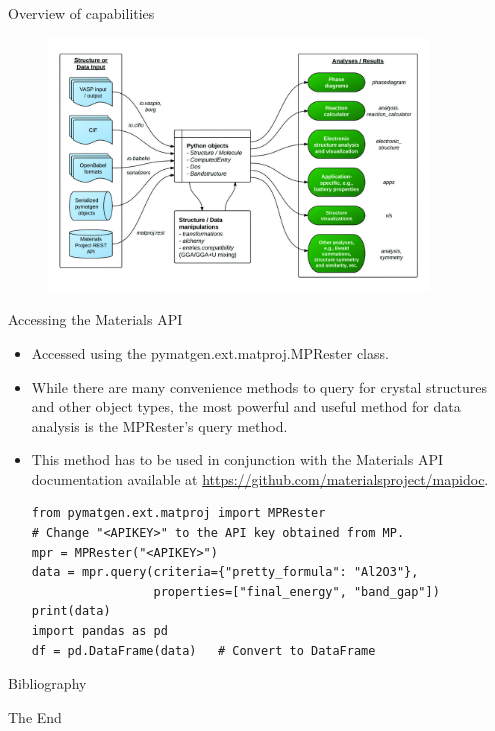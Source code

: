 \documentclass[aspectratio=169]{beamer}
\begin{document}
\begin{frame}{Overview of capabilities}
    \begin{figure}
        \centering
        \includegraphics[width=0.9\textwidth]{figures/pymatgen-overview.jpg}
    \end{figure}
\end{frame}


\begin{frame}[fragile]{Accessing the Materials API}
    \begin{itemize}
        \item Accessed using the pymatgen.ext.matproj.MPRester class.
        \item While there are many convenience methods to query for crystal structures and other object types, the most powerful and useful method for data analysis is the MPRester's query method.
        \item This method has to be used in conjunction with the Materials API documentation available at \url{https://github.com/materialsproject/mapidoc}.
\begin{lstlisting}
from pymatgen.ext.matproj import MPRester
# Change "<APIKEY>" to the API key obtained from MP.
mpr = MPRester("<APIKEY>")
data = mpr.query(criteria={"pretty_formula": "Al2O3"}, 
                 properties=["final_energy", "band_gap"])
print(data)
import pandas as pd
df = pd.DataFrame(data)   # Convert to DataFrame
\end{lstlisting}
    \end{itemize}
\end{frame} 


\begin{frame}{Bibliography}
    \scriptsize{
    
    
    }
\end{frame}


\begin{frame}
    \Huge{\centerline{The End}}
\end{frame}
\end{document}
